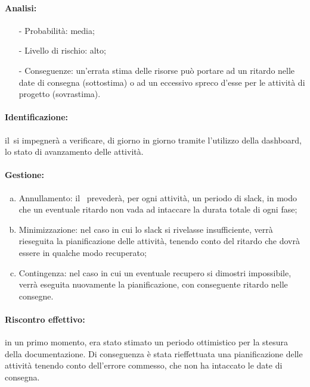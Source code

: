 \documentclass[../PianoProgetto.tex]{subfiles}
\begin{document}
	\paragraph*{Analisi:}
	\begin{itemize}
		\item[-] Probabilità: media;
		\item[-] Livello di rischio: alto;
		\item[-] Conseguenze: un'errata stima delle risorse può portare ad un ritardo nelle date di consegna (sottostima) o ad un eccessivo spreco d'esse per le attività di progetto (sovrastima).
	\end{itemize}
	
	\paragraph*{Identificazione:} il\responsabilediprogetto\ si impegnerà a verificare, di giorno in giorno tramite l'utilizzo della dashboard, lo stato di avanzamento delle attività.
	
	\paragraph*{Gestione:}
	\begin{enumerate}[(a)]
		\item Annullamento: il \responsabilediprogetto\ prevederà, per ogni attività, un periodo di slack, in modo che un eventuale ritardo non vada ad intaccare la durata totale di ogni fase;
		\item Minimizzazione: nel caso in cui lo slack si rivelasse insufficiente, verrà rieseguita la pianificazione delle attività, tenendo conto del ritardo che dovrà essere in qualche modo recuperato;
		\item Contingenza: nel caso in cui un eventuale recupero si dimostri impossibile, verrà eseguita nuovamente la pianificazione, con conseguente ritardo nelle consegne.
	\end{enumerate}	
	
	\paragraph*{Riscontro effettivo:} in un primo momento, era stato stimato un periodo ottimistico per la stesura della documentazione. Di conseguenza è stata rieffettuata una pianificazione delle attività tenendo conto dell’errore commesso, che non ha intaccato le date di consegna.
\end{document}
